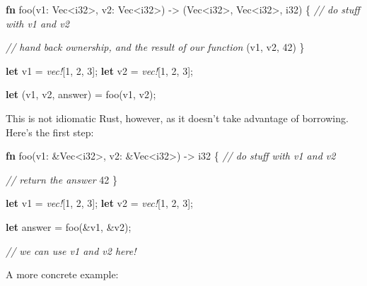 \documentclass[a4paper,]{book}
\newenvironment{Shaded}{\begin{snugshade}}{\end{snugshade}}
\newcommand{\KeywordTok}[1]{\textcolor[rgb]{0.13,0.29,0.53}{\textbf{{#1}}}}
\newcommand{\DataTypeTok}[1]{\textcolor[rgb]{0.13,0.29,0.53}{{#1}}}
\newcommand{\DecValTok}[1]{\textcolor[rgb]{0.00,0.00,0.81}{{#1}}}
\newcommand{\CommentTok}[1]{\textcolor[rgb]{0.56,0.35,0.01}{\textit{{#1}}}}
\newcommand{\PreprocessorTok}[1]{\textcolor[rgb]{0.56,0.35,0.01}{\textit{{#1}}}}
\newcommand{\NormalTok}[1]{{#1}}
\begin{document}
\begin{Shaded}
\begin{Highlighting}[]
\KeywordTok{fn} \NormalTok{foo(v1: }\DataTypeTok{Vec}\NormalTok{<}\DataTypeTok{i32}\NormalTok{>, v2: }\DataTypeTok{Vec}\NormalTok{<}\DataTypeTok{i32}\NormalTok{>) -> (}\DataTypeTok{Vec}\NormalTok{<}\DataTypeTok{i32}\NormalTok{>, }\DataTypeTok{Vec}\NormalTok{<}\DataTypeTok{i32}\NormalTok{>, }\DataTypeTok{i32}\NormalTok{) \{}
    \CommentTok{// do stuff with v1 and v2}

    \CommentTok{// hand back ownership, and the result of our function}
    \NormalTok{(v1, v2, }\DecValTok{42}\NormalTok{)}
\NormalTok{\}}

\KeywordTok{let} \NormalTok{v1 = }\PreprocessorTok{vec!}\NormalTok{[}\DecValTok{1}\NormalTok{, }\DecValTok{2}\NormalTok{, }\DecValTok{3}\NormalTok{];}
\KeywordTok{let} \NormalTok{v2 = }\PreprocessorTok{vec!}\NormalTok{[}\DecValTok{1}\NormalTok{, }\DecValTok{2}\NormalTok{, }\DecValTok{3}\NormalTok{];}

\KeywordTok{let} \NormalTok{(v1, v2, answer) = foo(v1, v2);}
\end{Highlighting}
\end{Shaded}

This is not idiomatic Rust, however, as it doesn't take advantage of
borrowing. Here's the first step:

\begin{Shaded}
\begin{Highlighting}[]
\KeywordTok{fn} \NormalTok{foo(v1: &}\DataTypeTok{Vec}\NormalTok{<}\DataTypeTok{i32}\NormalTok{>, v2: &}\DataTypeTok{Vec}\NormalTok{<}\DataTypeTok{i32}\NormalTok{>) -> }\DataTypeTok{i32} \NormalTok{\{}
    \CommentTok{// do stuff with v1 and v2}

    \CommentTok{// return the answer}
    \DecValTok{42}
\NormalTok{\}}

\KeywordTok{let} \NormalTok{v1 = }\PreprocessorTok{vec!}\NormalTok{[}\DecValTok{1}\NormalTok{, }\DecValTok{2}\NormalTok{, }\DecValTok{3}\NormalTok{];}
\KeywordTok{let} \NormalTok{v2 = }\PreprocessorTok{vec!}\NormalTok{[}\DecValTok{1}\NormalTok{, }\DecValTok{2}\NormalTok{, }\DecValTok{3}\NormalTok{];}

\KeywordTok{let} \NormalTok{answer = foo(&v1, &v2);}

\CommentTok{// we can use v1 and v2 here!}
\end{Highlighting}
\end{Shaded}

A more concrete example:
\end{document}
